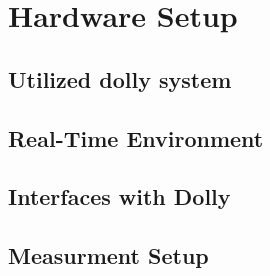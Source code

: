 \documentclass[ExampleMasters.tex]{subfiles}
\begin{document}
\clearpage


\chapter{Hardware Setup}

\section{Utilized dolly system}

\section{Real-Time Environment}

\section{Interfaces with Dolly}

\section{Measurment Setup}
\end{document}
